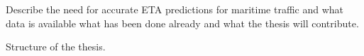 \documentclass[../main.tex]{subfiles}
\begin{document}
Describe the need for accurate ETA predictions for maritime traffic and what data is available what has been done already and what the thesis will contribute.

Structure of the thesis.
\end{document}
